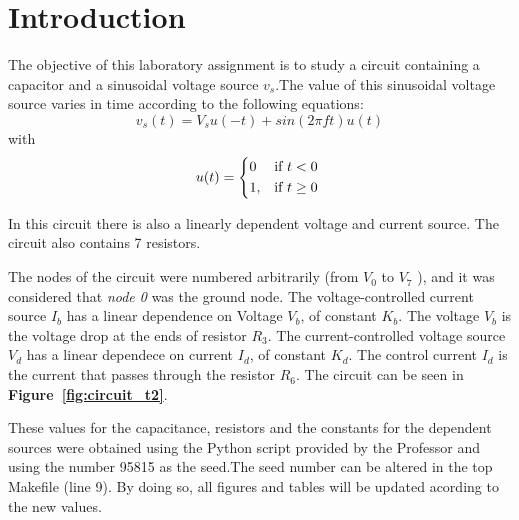 \section{Introduction}
\label{sec:introduction}

\par The objective of this laboratory assignment is to study a circuit containing a capacitor and a sinusoidal voltage source $v_s$.The value of this sinusoidal voltage source varies in time according to the following equations: 
\begin {equation}
	v_s( t)  = V_s u(-t) + sin( 2 \pi f t ) u( t)
	\label{eq:i1}
\end{equation}
 with 
\begin {equation}
	u( t ) =  
	\begin{cases*} 
	  0 & if $t < 0$ \\
	1, & if $t \geq 0$
	\end{cases*}
	\label{eq:i2}
\end{equation}

In this circuit there is also a linearly dependent voltage and current source. The circuit also contains 7 resistors.\par
The nodes of the circuit were numbered arbitrarily (from {\it$V_{0}$}  to {\it$V_{7}$} ), and it was considered that {\it node 0} was the ground node. The voltage-controlled current source {\it $I_b$} has a linear dependence on Voltage {\it $V_b$}, of constant {\it $K_b$}. The voltage {\it $V_b$} is the voltage drop at the ends of resistor {\it $R_3$}. The current-controlled voltage source {\it $V_d$} has a linear dependece on current {\it $I_d$}, of constant {\it $K_d$}. The control current {\it $I_d$} is the current that passes through the resistor {\it $R_6$}.
The circuit can be seen in \textbf{Figure~\ref{fig:circuit_t2}}.\par
These values for the capacitance, resistors and the constants for the dependent sources were obtained using the
Python script provided by the Professor 
and using the number 95815 as the seed.The seed number can be altered in the top Makefile (line 9). By doing so, all figures and tables will be updated acording to the new values. \par

